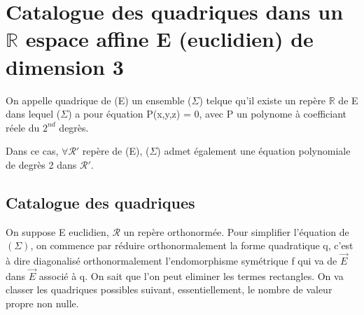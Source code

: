 \section{Catalogue des quadriques dans un $\mathbb{R}$ espace affine E (euclidien) de dimension 3}
\begin{de}
On appelle quadrique de (E) un ensemble ($\Sigma$) telque qu'il existe un repère $\mathbb{R}$ de E dans lequel ($\Sigma$) a pour équation P(x,y,z) = 0, avec P un polynome à coefficiant réele du $2^{nd}$ degrès.
\end{de}
\begin{prop}
Dans ce cas, $\forall \mathcal{R}'$ repère de (E), ($\Sigma$) admet également une équation polynomiale de degrès 2 dans $\mathcal{R}'$. 
\end{prop}
\subsection{Catalogue des quadriques}
On suppose E euclidien, $\mathcal{R}$ un repère orthonormée. Pour simplifier l'équation de $(\Sigma)$, on commence par réduire orthonormalement la forme quadratique q, c'est à dire diagonalisé orthonormalement l'endomorphisme symétrique f qui va de $\overrightarrow{E}$ dans $\overrightarrow{E}$ associé à q. On sait que l'on peut eliminer les termes rectangles. On va classer les quadriques possibles suivant, essentiellement, le nombre de valeur propre non nulle. 
